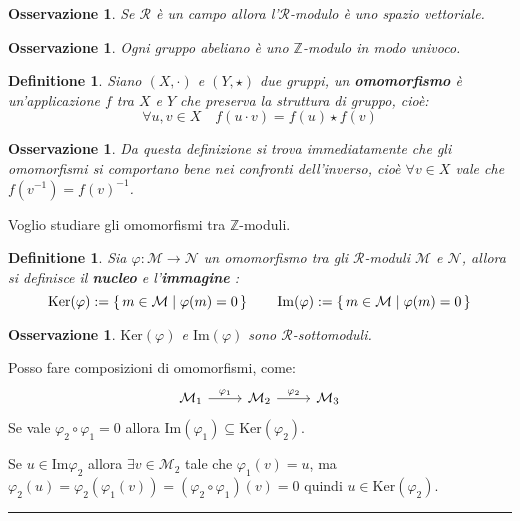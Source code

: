 \documentclass{article}
\newtheorem{osservation}[theorem]{Osservazione}
\newtheorem{definition}[theorem]{Definitione}
\newenvironment{proof}{{\bf Dimostrazione:}}{\hfill\rule{2mm}{2mm}}
\newcommand{\R}{\mathcal{R}}
\newcommand{\M}{\mathcal{M}}
\newcommand{\N}{\mathcal{N}}
\newcommand{\Z}{\mathbb{Z}}
\newcommand{\im}{\mathrm{Im}}
\renewcommand{\ker}{\mathrm{Ker}}
\renewcommand{\phi}{\varphi}
\begin{document}

\begin{osservation}
  Se $ \R $ è un campo allora l'$ \R $-modulo è uno spazio vettoriale.
\end{osservation}

\begin{osservation}
  Ogni gruppo abeliano è uno $ \Z $-modulo in modo univoco.
\end{osservation}

\begin{definition}
  Siano $ (X, \cdot) $ e $ (Y, \star) $ due gruppi, un \textbf{omomorfismo}  è un'applicazione $ f $
  tra $ X $ e $ Y $ che preserva la struttura di gruppo, cioè:
  \[
    \forall u,v \in X \quad f(u \cdot v) = f(u) \star f(v)
  \]
\end{definition}

\begin{osservation}
  Da questa definizione si trova immediatamente che gli omomorfismi si comportano bene nei
  confronti dell'inverso, cioè $ \forall v \in X $ vale che $ f(v^{-1}) = {f(v)}^{-1} $.
\end{osservation}

Voglio studiare gli omomorfismi tra $ \Z $-moduli.

\begin{definition}
  Sia $ \phi: \M \to \N $ un omomorfismo tra gli $ \R $-moduli $ \M $ e $ \N $,
  allora si definisce il \textbf{nucleo}  e l'\textbf{immagine} :
  \[
    \ker (\phi) := \set{ m \in \M | \phi(m) = 0}  \qquad  \im (\phi) := \set{ m \in \M | \phi(m) = 0}
  \]
\end{definition}

\begin{osservation}
  $ \ker (\phi) $ e $ \im (\phi) $ sono $ \R $-sottomoduli.
\end{osservation}

Posso fare composizioni di omomorfismi, come:
\[
  \begin{tikzcd}
    \M_1 \arrow{r}{\phi_1} & \M_2 \arrow{r}{\phi_2} & \M_3
  \end{tikzcd}
\]
Se vale $ \phi_2 \circ \phi_1 = 0 $ allora $ \im (\phi_1) \subseteq \ker (\phi_2) $.

\begin{proof}
  Se $ u \in \im {\phi_2} $ allora $ \exists v \in \M_2 $ tale che $ \phi_1(v) = u $,
  ma $ \phi_2(u) = \phi_2(\phi_1(v)) = (\phi_2 \circ \phi_1)(v) = 0 $ quindi $ u \in \ker(\phi_2) $.
\end{proof}
\end{document}
